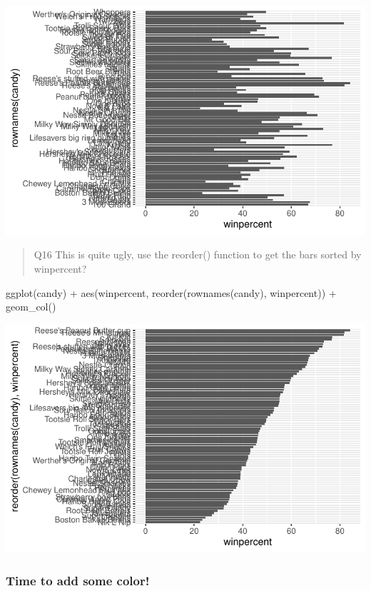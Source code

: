 \documentclass[
  letterpaper,
  DIV=11,
  numbers=noendperiod]{scrartcl}
\newenvironment{Shaded}{\begin{snugshade}}{\end{snugshade}}
\newcommand{\FunctionTok}[1]{\textcolor[rgb]{0.28,0.35,0.67}{#1}}
\newcommand{\NormalTok}[1]{\textcolor[rgb]{0.00,0.23,0.31}{#1}}
\newcommand{\SpecialCharTok}[1]{\textcolor[rgb]{0.37,0.37,0.37}{#1}}
\begin{document}
\includegraphics{Class09_files/figure-pdf/unnamed-chunk-15-1.pdf}

\begin{quote}
Q16 This is quite ugly, use the reorder() function to get the bars
sorted by winpercent?
\end{quote}

\begin{Shaded}
\begin{Highlighting}[]
\FunctionTok{ggplot}\NormalTok{(candy) }\SpecialCharTok{+} 
  \FunctionTok{aes}\NormalTok{(winpercent, }\FunctionTok{reorder}\NormalTok{(}\FunctionTok{rownames}\NormalTok{(candy), winpercent)) }\SpecialCharTok{+}
  \FunctionTok{geom\_col}\NormalTok{()}
\end{Highlighting}
\end{Shaded}

\includegraphics{Class09_files/figure-pdf/unnamed-chunk-16-1.pdf}

\subsubsection{Time to add some color!}\label{time-to-add-some-color}
\end{document}

